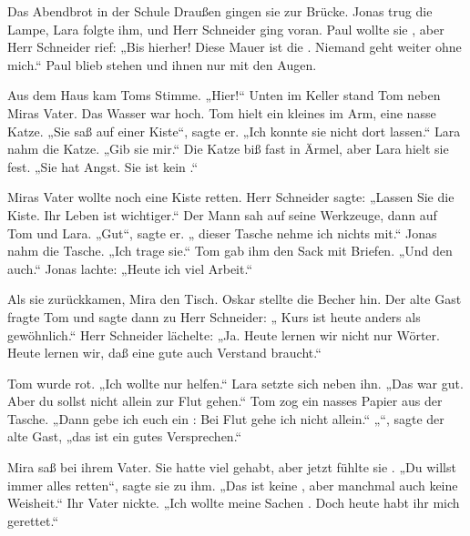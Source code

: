 \documentclass[12pt]{nextbook}
\begin{document}
\begin{readersection}{Das Abendbrot in der Schule}
Draußen gingen sie  zur Brücke. Jonas trug die Lampe, Lara folgte ihm, und Herr Schneider ging voran. Paul wollte sie , aber Herr Schneider rief: „Bis hierher! Diese Mauer ist die . Niemand geht weiter ohne mich.“ Paul blieb stehen und  ihnen nur mit den Augen.

Aus dem Haus kam Toms Stimme. „Hier!“ Unten im Keller stand Tom neben Miras Vater. Das Wasser war hoch. Tom hielt ein kleines  im Arm, eine nasse Katze. „Sie saß auf einer Kiste“, sagte er. „Ich konnte sie nicht dort lassen.“ Lara nahm die Katze. „Gib sie mir.“ Die Katze biß fast in  Ärmel, aber Lara hielt sie fest. „Sie hat Angst. Sie ist kein .“

Miras Vater wollte noch eine Kiste retten. Herr Schneider sagte: „Lassen Sie die Kiste. Ihr Leben ist wichtiger.“ Der Mann sah auf seine Werkzeuge, dann auf Tom und Lara. „Gut“, sagte er. „ dieser Tasche nehme ich nichts mit.“ Jonas nahm die Tasche. „Ich trage sie.“ Tom gab ihm den Sack mit Briefen. „Und den auch.“ Jonas lachte: „Heute  ich viel Arbeit.“

Als sie zurückkamen,  Mira den Tisch. Oskar stellte die Becher hin. Der alte Gast fragte  Tom und sagte dann zu Herr Schneider: „ Kurs ist heute anders als gewöhnlich.“ Herr Schneider lächelte: „Ja. Heute lernen wir nicht nur Wörter. Heute lernen wir, daß eine gute  auch Verstand braucht.“

Tom wurde rot. „Ich wollte nur helfen.“ Lara setzte sich neben ihn. „Das war gut. Aber du sollst nicht allein zur Flut gehen.“ Tom zog ein nasses Papier aus der Tasche. „Dann gebe ich euch ein : Bei Flut gehe ich nicht allein.“ „“, sagte der alte Gast, „das ist ein gutes Versprechen.“

Mira saß bei ihrem Vater. Sie hatte viel  gehabt, aber jetzt fühlte sie . „Du willst immer alles retten“, sagte sie zu ihm. „Das ist keine , aber manchmal auch keine Weisheit.“ Ihr Vater nickte. „Ich wollte meine Sachen . Doch heute habt ihr mich gerettet.“


\end{readersection}
\end{document}
